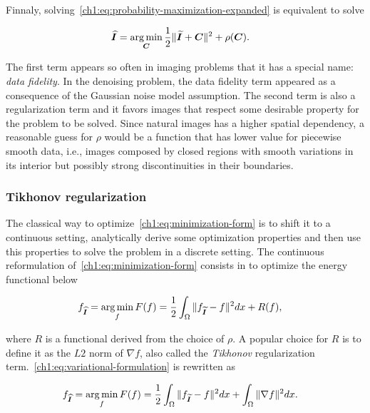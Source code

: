 Finnaly, solving~\cref{ch1:eq:probability-maximization-expanded} is equivalent to solve

\begin{align}
	\bm{\widehat{I}} &= \operatorname*{arg\,min} _{\bm{C}} \frac{1}{2}\lVert\bm{\widetilde{I}} + \bm{C}\rVert^2 + \rho(\bm{C}).
	\label{ch1:eq:minimization-form}
\end{align}

The first term appears so often in imaging problems that it has a special name: \emph{data fidelity}. In the denoising problem, the data fidelity term appeared as a consequence of the Gaussian noise model assumption. The second term is also a regularization term and it favors images that respect some desirable property for the problem to be solved. Since natural images has a higher spatial dependency, a reasonable guess for $\rho$ would be a function that has lower value for piecewise smooth data, i.e., images composed by closed regions with smooth variations in its interior but possibly strong discontinuities in their boundaries. 


\subsubsection{Tikhonov regularization}
\label{ch1:subsec:tikhonov-regularization}
The classical way to optimize~\cref{ch1:eq:minimization-form} is to shift it to a continuous setting, analytically derive some optimization properties and then use this properties to solve the problem in a discrete setting. The continuous reformulation of~\cref{ch1:eq:minimization-form} consists in to optimize the energy functional below

\begin{align}
	f_{\bm{\widehat{I}}} &= \operatorname*{arg\,min}_{f} F(f) = \frac{1}{2} \int_{\Omega}{ \lVert f_{\bm{\widetilde{I}}} - f\rVert^2dx} + R(f),
	\label{ch1:eq:variational-formulation}
\end{align}

where $R$ is a functional derived from the choice of $\rho$. A popular choice for $R$ is to define it as the $L2$ norm of $\nabla f$, also called the \emph{Tikhonov} regularization term.~\cref{ch1:eq:variational-formulation} is rewritten as

\begin{align}
	f_{\bm{\widehat{I}}} &= \operatorname*{arg\,min}_{f} F(f) = \frac{1}{2} \int_{\Omega}{ \lVert f_{\bm{\widetilde{I}}} - f\rVert^2dx} + \int_{\Omega}{ \lVert \nabla f \rVert^2 dx }.
	\label{ch1:tikhonov-formulation}
\end{align}

